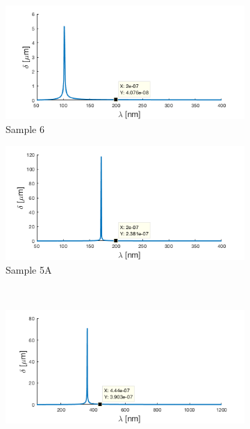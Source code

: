 
\begin{figure}
    \begin{subfigure}{.5\textwidth}
        \centering %
        \includegraphics[width=\linewidth,trim=0.5cm 0cm 1cm 0cm, clip]{figures/Appendix/DecayLengthOfDiffractedMode_Sample6.png}
        \caption{Sample 6}
        \label{}
    \end{subfigure}
    \begin{subfigure}{.5\textwidth}
        \centering %
        \includegraphics[width=\linewidth,trim=0.5cm 0cm 1cm 0cm, clip]{figures/Appendix/DecayLengthOfDiffractedMode_Sample5A.png}
        \caption{Sample 5A}
        \label{}
    \end{subfigure}
    \\
    \begin{subfigure}{.5\textwidth}
        \centering %
        \includegraphics[width=\linewidth,trim=0.5cm 0cm 1cm 0cm, clip]{figures/Appendix/DecayLengthOfDiffractedMode_Sample5B.png}

\end{subfigure}
\end{figure}
